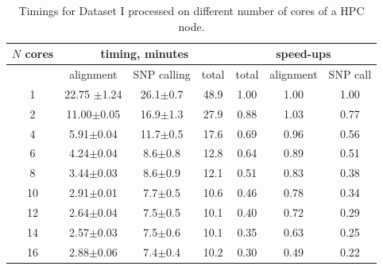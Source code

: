 \documentclass[10pt]{article}
\begin{document}
\begin{table}[!ht]
\small
\caption{Timings for Dataset I processed on different number of cores of a HPC node.}
\begin{center}
\begin{tabular}{c|c|c|c|ccc}
$N$ cores	&\multicolumn{3}{c|}{timing, minutes}&\multicolumn{3}{c}{speed-ups} \\
\hline
	& alignment 	&	SNP calling	&	total  &total & alignment& SNP call\\
\hline
1	&	22.75	$\pm$1.24&	26.1$\pm$0.7	&	48.9	&	 1.00	&	1.00	&	1.00\\
2	&	11.00$\pm$0.05	&	16.9$\pm$1.3	&	27.9	&	 0.88	&	1.03	&	0.77\\
4	&	5.91$\pm$0.04	&	11.7$\pm$0.5	&	17.6	&	 0.69	&	0.96	&	0.56\\
6	&	4.24$\pm$0.04	&	8.6$\pm$0.8	&	12.8	&	 0.64	&	0.89	&	0.51\\
8	&	3.44$\pm$0.03	&	8.6$\pm$0.9	&	12.1	&	 0.51	&	0.83	&	0.38\\
10	&	2.91$\pm$0.01	&	7.7$\pm$0.5	&	10.6	&	 0.46	&	0.78	&	0.34\\
12	&	2.64$\pm$0.04	&	7.5$\pm$0.5	&	10.1	&	 0.40	&	0.72	&	0.29\\
14	&	2.57$\pm$0.03	&	7.5$\pm$0.6	&	10.1	&	 0.35	&	0.63	&	0.25\\
16	&	2.88$\pm$0.06	&	7.4$\pm$0.4	&	10.2	&	 0.30	&	0.49	&	0.22\\
\end{tabular}
\end{center}
\label{table:3}
\normalsize
\end{table}
\end{document}
